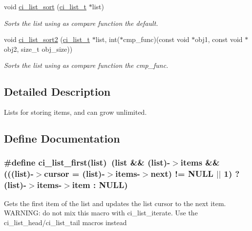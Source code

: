\begin{DoxyCompactItemize}
void \hyperlink{group__LISTS_ga5253cbf795ff0b07b8ad8aad68c6880e}{ci\_\-list\_\-sort} (\hyperlink{group__LISTS_ga785498c08d3d0440e1403146d0dfdb57}{ci\_\-list\_\-t} $\ast$list)
\begin{DoxyCompactList}\small\item\em Sorts the list using as compare function the default. \item\end{DoxyCompactList}\item 
void \hyperlink{group__LISTS_ga39a78437be7f9f78d6d93f69d7fe76d4}{ci\_\-list\_\-sort2} (\hyperlink{group__LISTS_ga785498c08d3d0440e1403146d0dfdb57}{ci\_\-list\_\-t} $\ast$list, int($\ast$cmp\_\-func)(const void $\ast$obj1, const void $\ast$obj2, size\_\-t obj\_\-size))
\begin{DoxyCompactList}\small\item\em Sorts the list using as compare function the cmp\_\-func. \item\end{DoxyCompactList}\end{DoxyCompactItemize}


\subsection{Detailed Description}
Lists for storing items, and can grow unlimited. 

\subsection{Define Documentation}
\hypertarget{group__LISTS_ga77f44d5b3bada068ec700d4b281c3a1f}{
\subsubsection[{ci\_\-list\_\-first}]{\setlength{\rightskip}{0pt plus 5cm}\#define ci\_\-list\_\-first(list)~(list \&\& (list)-\/$>$items \&\& (((list)-\/$>$cursor = (list)-\/$>$items-\/$>$next) != NULL $|$$|$ 1) ? (list)-\/$>$items-\/$>$item : NULL)}}
\label{group__LISTS_ga77f44d5b3bada068ec700d4b281c3a1f}


Gets the first item of the list and updates the list cursor to the next item. WARNING: do not mix this macro with ci\_\-list\_\-iterate. Use the ci\_\-list\_\-head/ci\_\-list\_\-tail macros instead


